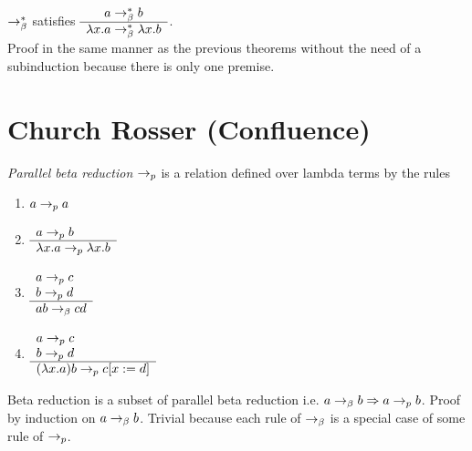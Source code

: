 \documentclass{article}
\begin{document}
\begin{theorem}
  $\to^*_\beta$ satisfies
  $\begin{array}{c} 
    a\to^*_\beta b \\ \hline \lambda x.a \to^*_\beta \lambda x.b\end{array}$.\\
Proof in the same manner as the previous theorems without the need of a
subinduction because there is only one premise.
\end{theorem}







\section{Church Rosser (Confluence)}

\begin{definition}
  \emph{Parallel beta reduction} $\to_{p}$ is a relation
  defined over lambda terms by the rules
  \begin{enumerate}
  \item $a \to_{p} a$
  \item $\begin{array}{l} a \to_{p} b \\ \hline \lambda x.a \to_{p} \lambda x.b\end{array}$
  \item $\begin{array}{l} a\to_{p} c \\ b \to_{p} d \\ \hline a b \to_\beta c d\end{array}$
  \item $\begin{array}{l} a\to_{p} c \\ b \to_{p} d \\ \hline (\lambda x.a) b \to_{p} c[x := d]\end{array}$
  \end{enumerate}
\end{definition}

\begin{lemma}
  Beta reduction is a subset of parallel beta reduction i.e.
  $a \to_\beta b \Rightarrow a \to_{p} b$.
  Proof by induction on $a \to_\beta b$. Trivial because each rule of $\to_\beta$
  is a special case of some rule of $\to_{p}$.
\end{lemma}
\end{document}

